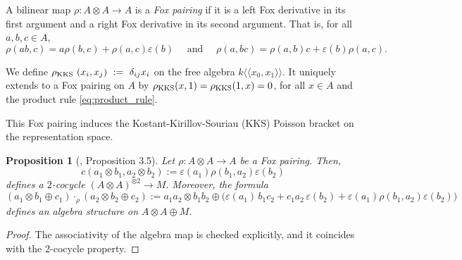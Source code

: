 \documentclass[a4paper,fleqn]{cas-sc}
\newtheorem{proposition}[theorem]{Proposition}
\newcommand{\kk}{k\langle \langle x_0, x_1 \rangle \rangle}
\begin{document}
\begin{definition}
    A bilinear map $\rho: A\otimes A\to A$ is a \textit{Fox pairing} if it is a left Fox derivative in its first argument and a right Fox derivative in its second argument. That is,  for all $a,b,c \in A$,
	\begin{equation}\label{eq:product_rule}
		\rho(ab, c) =a\rho(b, c)+\rho(a, c)\varepsilon(b) \quad \text{ and } \quad
        \rho(a,bc) =\rho(a,b)c+\varepsilon(b)\rho(a,c).
	\end{equation}
\end{definition}

\begin{ex}
 We define
    $
        \rho_{\rm{KKS}}~(x_i,x_j)~:=~\delta_{ij}x_i
    $
on the free algebra $\kk$. It uniquely extends to a Fox pairing on $A$ by $\rho_{\rm{KKS}}(x,1)=\rho_{\rm{KKS}}(1,x)=0$, for all $x \in A$ and the product rule \eqref{eq:product_rule}.
\end{ex}
\begin{rmk}
This Fox pairing induces the Kostant-Kirillov-Souriau (KKS) Poisson bracket on the representation space.
\end{rmk}

\begin{proposition}[\cite{ANR}, Proposition 3.5]\label{prop:forpairing2cocycle}
	Let $\rho \colon A \otimes A \to A$ be a Fox pairing. Then,
	$$
	c(a_1 \otimes b_1, a_2 \otimes b_2) := \varepsilon(a_1) \rho(b_1,a_2) \varepsilon(b_2)
	$$
	defines a $2$-cocycle $(A \otimes A)^{\otimes 2} \to M$.
	Moreover, the formula
	$$
		(a_1 \otimes b_1 \oplus c_1) \cdot_{\rho} (a_2 \otimes b_2 \oplus c_2) := a_1 a_2 \otimes b_1 b_2 \oplus \big( \varepsilon(a_1) \, b_1 c_2 + c_1 a_2 \, \varepsilon(b_2) + \varepsilon(a_1) \rho(b_1,a_2) \varepsilon(b_2) \big)
		\label{eqn:multiplicationfromfoxp}
	$$
	defines an algebra structure on $A \otimes A \oplus M$.
\end{proposition}	

\begin{proof}
The associativity of the algebra map is checked explicitly, and it coincides with the $2$-cocycle property.
\end{proof}
\end{document}
